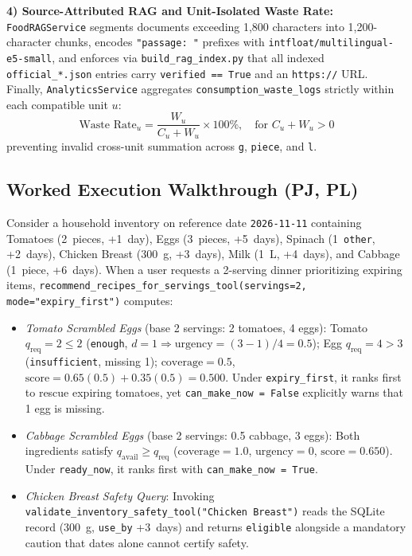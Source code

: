 \documentclass[conference]{IEEEtran}
\begin{document}
\textbf{4) Source-Attributed RAG and Unit-Isolated Waste Rate:} \texttt{FoodRAGService} segments documents exceeding 1,800 characters into 1,200-character chunks, encodes \texttt{"passage: "} prefixes with \texttt{intfloat/multilingual-e5-small}, and enforces via \texttt{build\_rag\_index.py} that all indexed \texttt{official\_*.json} entries carry \texttt{verified == True} and an \texttt{https://} URL. Finally, \texttt{AnalyticsService} aggregates \texttt{consumption\_waste\_logs} strictly within each compatible unit $u$:
\begin{equation}
\text{Waste Rate}_u = \frac{W_u}{C_u + W_u} \times 100\%, \quad \text{for } C_u + W_u > 0
\end{equation}
preventing invalid cross-unit summation across \texttt{g}, \texttt{piece}, and \texttt{l}.

\subsection{Worked Execution Walkthrough (PJ, PL)}
Consider a household inventory on reference date \texttt{2026-11-11} containing Tomatoes (2~pieces, +1~day), Eggs (3~pieces, +5~days), Spinach (1~\texttt{other}, +2~days), Chicken Breast (300~g, +3~days), Milk (1~L, +4~days), and Cabbage (1~piece, +6~days). When a user requests a 2-serving dinner prioritizing expiring items, \texttt{recommend\_recipes\_for\_servings\_tool(servings=2, mode="expiry\_first")} computes:
\begin{itemize}
    \item \emph{Tomato Scrambled Eggs} (base 2 servings: 2 tomatoes, 4 eggs): Tomato $q_{\text{req}} = 2 \le 2$ (\texttt{enough}, $d=1 \Rightarrow \text{urgency} = (3-1)/4 = 0.5$); Egg $q_{\text{req}} = 4 > 3$ (\texttt{insufficient}, missing 1); $\text{coverage} = 0.5$, $\text{score} = 0.65(0.5)+0.35(0.5) = 0.500$. Under \texttt{expiry\_first}, it ranks first to rescue expiring tomatoes, yet \texttt{can\_make\_now = False} explicitly warns that 1 egg is missing.
    \item \emph{Cabbage Scrambled Eggs} (base 2 servings: 0.5 cabbage, 3 eggs): Both ingredients satisfy $q_{\text{avail}} \ge q_{\text{req}}$ ($\text{coverage} = 1.0$, $\text{urgency} = 0$, $\text{score} = 0.650$). Under \texttt{ready\_now}, it ranks first with \texttt{can\_make\_now = True}.
    \item \emph{Chicken Breast Safety Query}: Invoking \texttt{validate\_inventory\_safety\_tool("Chicken Breast")} reads the SQLite record (300~g, \texttt{use\_by} +3~days) and returns \texttt{eligible} alongside a mandatory caution that dates alone cannot certify safety.
\end{itemize}
\end{document}
